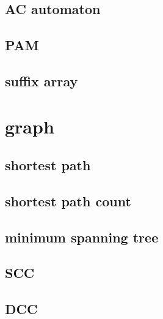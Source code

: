 \documentclass[UTF8, a4paper, titlepage, twoside]{ctexart}
\begin{document}
\subsection{AC automaton}

\subsection{PAM}


\subsection{suffix array}


\section{graph}
\subsection{shortest path}






\subsection{shortest path count}



\subsection{minimum spanning tree}




\subsection{SCC}




\subsection{DCC}




\end{document}
